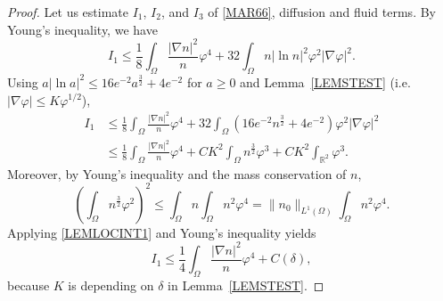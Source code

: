 \documentclass{amsart}
\numberwithin{equation}{section}
\newcommand{\R}{{ \mathbb{R}  }}
\begin{document}
\begin{proof}
Let us estimate $I_1$, $I_2$, and $I_3$ of \eqref{MAR66}, diffusion and fluid terms. By Young's inequality, we have 
\[
I_1 \le \frac{1}{8}\int_{\Omega} \frac{|\nabla n|^{2}}{n}\varphi^{4}+ 32\int_{\Omega} n|\ln n|^{2} \varphi^{2} |\nabla \varphi|^{2}. 
\]
Using $a|\ln a|^{2}\le 16e^{-2}a^{\frac{3}{2}}+4e^{-2}$ for $a\ge0$ and Lemma~\ref{LEMSTEST} (i.e.\ $|\nabla\varphi|\le K\varphi^{1/2}$),
\[\begin{aligned}
I_1 &\leq  \frac{1}{8}\int_{\Omega} \frac{|\nabla n|^{2}}{n}\varphi^{4}+ 32\int_{\Omega} (16e^{-2}n^{\frac{3}{2}}+4e^{-2}) \varphi^{2} |\nabla \varphi|^{2}
\\&
\le  \frac{1}{8}\int_{\Omega} \frac{|\nabla n|^{2}}{n}\varphi^{4}
+ C K^{2} \int_{\Omega}n^{\frac{3}{2}}\varphi^{3}+C K^{2}\int_{\R^{2}}\varphi^{3}.
\end{aligned}\]
Moreover, by Young's inequality and the mass conservation of $n$,
\begin{equation}\label{S2}
\left(\int_{\Omega}n^{\frac{3}{2}}\varphi^{2}\right)^{2}\le \int_{\Omega}n\int_{\Omega}n^{2}\varphi^{4}
=\|n_{0}\|_{L^{1}(\Omega)}\int_{\Omega}n^{2}\varphi^{4}. 
\end{equation}
Applying \eqref{LEMLOCINT1} and Young's inequality yields
\begin{equation}\label{FORTHTERM}
I_1\le\frac{1}{4}\int_{\Omega} \frac{|\nabla n|^{2}}{n}\varphi^{4}+C(\delta),
\end{equation}
because $K$ is depending on $\delta$ in Lemma~\ref{LEMSTEST}. 


\end{proof}
\end{document}

